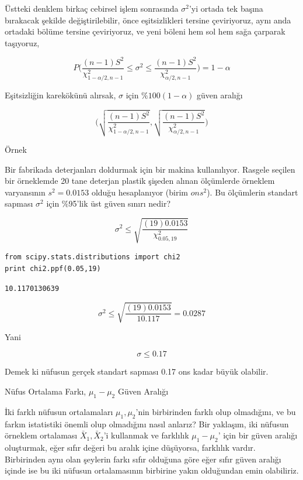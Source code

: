 \documentclass[12pt,fleqn]{article}\usepackage{../../common}
\begin{document}
Üstteki denklem birkaç cebirsel işlem sonrasında $\sigma^2$'yi ortada tek
başına bırakacak şekilde değiştirilebilir, önce eşitsizlikleri tersine
çeviriyoruz, aynı anda ortadaki bölüme tersine çeviriyoruz, ve yeni böleni
hem sol hem sağa çarparak taşıyoruz,

$$
P
\bigg(
\frac{(n-1)S^2}{\chi_{1-\alpha/2,n-1}^2} \le
\sigma^2  \le
\frac{(n-1)S^2}{\chi_{\alpha/2,n-1}^2} 
\bigg) = 1-\alpha
$$

Eşitsizliğin karekökünü alırsak, $\sigma$ için $\%100(1-\alpha)$ güven
aralığı

$$
\bigg(
\sqrt{\frac{(n-1)S^2}{\chi_{1-\alpha/2,n-1}^2}}
,
\sqrt{\frac{(n-1)S^2}{\chi_{\alpha/2,n-1}^2}}
\bigg) 
$$

Örnek

Bir fabrikada deterjanları doldurmak için bir makina kullanılıyor. Rasgele
seçilen bir örneklemde 20 tane deterjan plastik şişeden alınan ölçümlerde
örneklem varyansının $s^2 = 0.0153$ olduğu hesaplanıyor (birim $ons^2$). Bu
ölçümlerin standart sapması $\sigma^2$ için \%95'lik üst güven sınırı nedir? 

$$ 
\sigma^2 \le
\sqrt{\frac{(19)0.0153}{\chi_{0.05,19}^2}}
 $$

\begin{verbatim}
from scipy.stats.distributions import chi2
print chi2.ppf(0.05,19)
\end{verbatim}

\begin{verbatim}
10.1170130639
\end{verbatim}

$$ 
\sigma^2 \le
\sqrt{\frac{(19)0.0153}{10.117}} = 0.0287
 $$

Yani

$$ \sigma \le 0.17 $$

Demek ki nüfusun gerçek standart sapması 0.17 ons kadar büyük olabilir.

Nüfus Ortalama Farkı, $\mu_1-\mu_2$ Güven Aralığı 

İki farklı nüfusun ortalamaları $\mu_1,\mu_2$'nin birbirinden farklı olup
olmadığını, ve bu farkın istatistiki önemli olup olmadığını nasıl anlarız?
Bir yaklaşım, iki nüfusun örneklem ortalaması $\bar{X}_1,\bar{X}_2$'i
kullanmak ve farklılık $\mu_1-\mu_2$' için bir güven aralığı oluşturmak,
eğer sıfır değeri bu aralık içine düşüyorsa, farklılık vardır. Birbirinden
aynı olan şeylerin farkı sıfır olduğuna göre eğer sıfır güven aralığı
içinde ise bu iki nüfusun ortalamasının birbirine yakın olduğundan emin
olabiliriz.  
\end{document}
